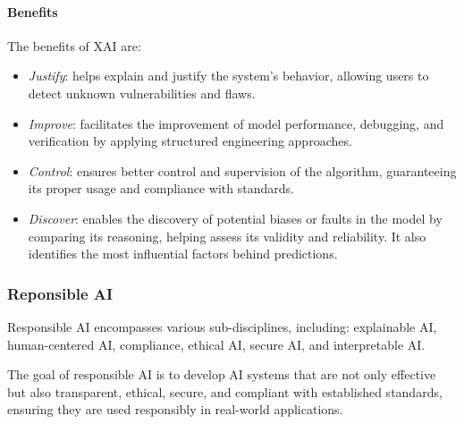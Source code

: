 \paragraph*{Benefits}
The benefits of XAI are: 
\begin{itemize}
    \item \textit{Justify}: helps explain and justify the system's behavior, allowing users to detect unknown vulnerabilities and flaws.
    \item \textit{Improve}: facilitates the improvement of model performance, debugging, and verification by applying structured engineering approaches.
    \item \textit{Control}: ensures better control and supervision of the algorithm, guaranteeing its proper usage and compliance with standards.
    \item \textit{Discover}: enables the discovery of potential biases or faults in the model by comparing its reasoning, helping assess its validity and reliability. 
        It also identifies the most influential factors behind predictions.
\end{itemize}

\subsubsection{Reponsible AI}
Responsible AI encompasses various sub-disciplines, including: explainable AI, human-centered AI, compliance, ethical AI, secure AI, and interpretable AI. 

The goal of responsible AI is to develop AI systems that are not only effective but also transparent, ethical, secure, and compliant with established standards, ensuring they are used responsibly in real-world applications.